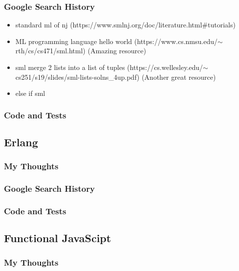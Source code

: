 \documentclass[letterpaper, 10pt, DIV=13]{scrartcl}
\numberwithin{equation}{section}
\numberwithin{figure}{section}
\numberwithin{table}{section}
\begin{document}
\subsubsection{Google Search History}
\begin{itemize}
    \item standard ml of nj (https://www.smlnj.org/doc/literature.html\#tutorials)
    \item ML programming language hello world (https://www.cs.nmsu.edu/$\sim$rth/cs/cs471/sml.html) (Amazing resource)
    \item sml merge 2 lists into a list of tuples (https://cs.wellesley.edu/$\sim$cs251/s19/slides/sml-lists-solns\_4up.pdf) (Another great resource)
    \item else if sml
\end{itemize}

\subsubsection{Code and Tests}



\subsection{Erlang}
\subsubsection{My Thoughts}

\subsubsection{Google Search History}

\subsubsection{Code and Tests}

\subsection{Functional JavaScipt}
\subsubsection{My Thoughts}
\end{document}
